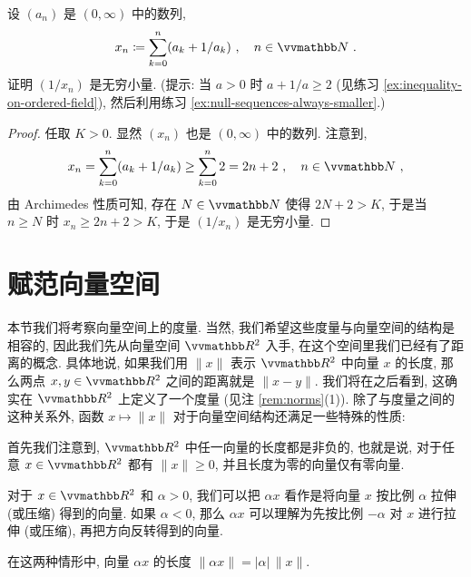 \begin{exercise}
    设 \((a_n)\) 是 \((0, \infty)\) 中的数列,
    \[
        x_n \coloneqq \sum_{k = 0}^n (a_k + 1 / a_k)\ ,\quad n \in \N\ .
    \]
    证明 \((1 / x_n)\) 是无穷小量. (提示: 当 \(a > 0\) 时 \(a + 1 / a \geq 2\) (见练习 \ref{ex:inequality-on-ordered-ﬁeld}), 然后利用练习 \ref{ex:null-sequences-always-smaller}.)
\end{exercise}

\begin{proof}
    任取 \(K > 0\). 显然 \((x_n)\) 也是 \((0, \infty)\) 中的数列. 注意到,
    \[
        x_n = \sum_{k = 0}^n (a_k + 1 / a_k) \geq \sum_{k = 0}^n 2 = 2 n + 2\ ,\quad n \in \N\ ,
    \]
    由 Archimedes 性质可知, 存在 \(N \in \N\) 使得 \(2 N + 2 > K\), 于是当 \(n \geq N\) 时 \(x_n \geq 2 n + 2 > K\), 于是 \((1 / x_n)\) 是无穷小量.
\end{proof}

\newpage

\section{赋范向量空间}

本节我们将考察向量空间上的度量. 当然, 我们希望这些度量与向量空间的结构是相容的, 因此我们先从向量空间 \(\R^2\) 入手, 在这个空间里我们已经有了距离的概念. 具体地说, 如果我们用 \(\|x\|\) 表示 \(\R^2\) 中向量 \(x\) 的长度, 那么两点 \(x, y \in \R^2\) 之间的距离就是 \(\|x - y\|\). 我们将在之后看到, 这确实在 \(\R^2\) 上定义了一个度量 (见注 \ref{rem:norms}(1)). 除了与度量之间的这种关系外, 函数 \(x \mapsto \|x\|\) 对于向量空间结构还满足一些特殊的性质:

首先我们注意到, \(\R^2\) 中任一向量的长度都是非负的, 也就是说, 对于任意 \(x \in \R^2\) 都有 \(\|x\| \geq 0\), 并且长度为零的向量仅有零向量.

对于 \(x \in \R^2\) 和 \(\alpha > 0\), 我们可以把 \(\alpha x\) 看作是将向量 \(x\) 按比例 \(\alpha\) 拉伸 (或压缩) 得到的向量. 如果 \(\alpha < 0\), 那么 \(\alpha x\) 可以理解为先按比例 \(- \alpha\) 对 \(x\) 进行拉伸 (或压缩), 再把方向反转得到的向量.
\begin{center}
\end{center}
在这两种情形中, 向量 \(\alpha x\) 的长度 \(\|\alpha x\| = |\alpha|\, \|x\|\).

